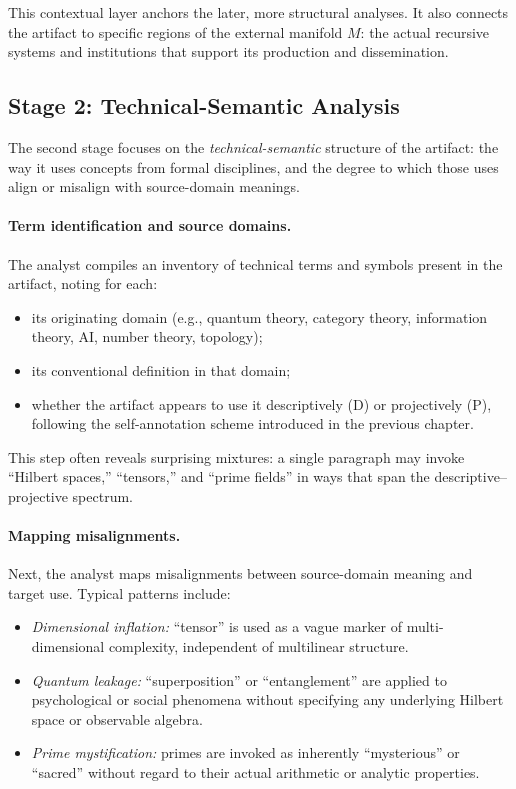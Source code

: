 \documentclass[12]{amsart}
\theoremstyle{plain}
\begin{document}
This contextual layer anchors the later, more structural analyses. It also connects the artifact to specific regions of the external manifold $M$: the actual recursive systems and institutions that support its production and dissemination.

\subsection{Stage 2: Technical-Semantic Analysis}

The second stage focuses on the \emph{technical-semantic} structure of the artifact: the way it uses concepts from formal disciplines, and the degree to which those uses align or misalign with source-domain meanings.

\paragraph{Term identification and source domains.} The analyst compiles an inventory of technical terms and symbols present in the artifact, noting for each:

\begin{itemize}
  \item its originating domain (e.g., quantum theory, category theory, information theory, AI, number theory, topology);
  \item its conventional definition in that domain;
  \item whether the artifact appears to use it descriptively (\textsc{D}) or projectively (\textsc{P}), following the self-annotation scheme introduced in the previous chapter.
\end{itemize}

This step often reveals surprising mixtures: a single paragraph may invoke ``Hilbert spaces,'' ``tensors,'' and ``prime fields'' in ways that span the descriptive–projective spectrum.

\paragraph{Mapping misalignments.} Next, the analyst maps misalignments between source-domain meaning and target use. Typical patterns include:

\begin{itemize}
  \item \emph{Dimensional inflation:} ``tensor'' is used as a vague marker of multi-dimensional complexity, independent of multilinear structure.
  \item \emph{Quantum leakage:} ``superposition'' or ``entanglement'' are applied to psychological or social phenomena without specifying any underlying Hilbert space or observable algebra.
  \item \emph{Prime mystification:} primes are invoked as inherently ``mysterious'' or ``sacred'' without regard to their actual arithmetic or analytic properties.
\end{itemize}
\end{document}
